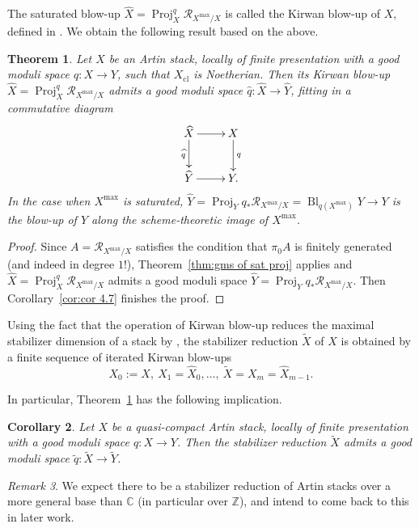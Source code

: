 \documentclass[a4paper,twoside,11pt]{amsart}
\theoremstyle{plain}
\newtheorem{theorem}{Theorem}[section]
\newtheorem{corollary}[theorem]{Corollary}
\theoremstyle{definition}
\theoremstyle{remark}
\newtheorem{remark}[theorem]{Remark}
\numberwithin{equation}{section}
\newcommand{\ZZ}{\mathbb{Z}} %
\newcommand{\CC}{\mathbb{C}} %
\DeclareMathOperator{\Proj}{Proj} %
\DeclareMathOperator{\Bl}{Bl}
\newcommand{\cl}{\mathrm{cl}} %
\newcommand{\rR}{\mathcal{R}}
\renewcommand{\tilde}{\widetilde}
\renewcommand{\hat}{\widehat}
\begin{document}
The saturated blow-up $\hat{X} = \Proj_X^q \rR_{X^{\max}/X}$ is called the Kirwan blow-up of $X$, defined in \cite[Definition~6.5]{HRS}. We obtain the following result based on the above.

\begin{theorem} \label{thm:gms of kirwan blow-up}
    Let $X$ be an Artin stack, locally of finite presentation with a good moduli space $q \colon X \to Y$, such that $X_\cl$ is Noetherian. Then its Kirwan blow-up $\hat{X} = \Proj_X^q \rR_{X^{\max}/X} $ admits a good moduli space $\hat{q} \colon \hat{X} \to \hat{Y}$, fitting in a commutative diagram
    \begin{align*}
        \xymatrix{
        \hat{X} \ar[d]_-{\hat{q}} \ar[r] & X \ar[d]^-{q} \\
        \hat{Y} \ar[r] & Y.
        }
    \end{align*}
    In the case when $X^{\max}$ is saturated, $\hat{Y} = \Proj_Y q_\ast \rR_{X^{\max}/X} =  \Bl_{q(X^{\max})} Y \to Y$ is the blow-up of $Y$ along the scheme-theoretic image of $X^{\max}$.
\end{theorem}

\begin{proof}
    Since $A = \rR_{X^{\max}/X}$ satisfies the condition that $\pi_0 A$ is finitely generated (and indeed in degree $1$!), Theorem~\ref{thm:gms of sat proj} applies and $\hat{X} = \Proj_X^q \rR_{X^{\max}/X}$ admits a good moduli space $\hat{Y} = \Proj_Y q_\ast \rR_{X^{\max}/X}$. Then Corollary~\ref{cor:cor 4.7} finishes the proof.
\end{proof}

Using the fact that the operation of Kirwan blow-up reduces the maximal stabilizer dimension of a stack by \cite[Theorem~6.7]{HRS}, the stabilizer reduction $\tilde{X}$ of $X$ is obtained by a finite sequence of iterated Kirwan blow-ups
$$ X_0 := X,\ X_1 = \hat{X}_0, \ldots,\ \tilde{X} = X_m = \hat{X}_{m-1}.$$

In particular, Theorem~\ref{thm:gms of kirwan blow-up} has the following implication.

\begin{corollary} \label{corr:gms of stab red}
    Let $X$ be a quasi-compact Artin stack, locally of finite presentation with a good moduli space $q \colon X \to Y$. Then the stabilizer reduction $\tilde{X}$ admits a good moduli space $\tilde{q} \colon \tilde{X} \to \tilde{Y}$.
\end{corollary}

\begin{remark}
    We expect there to be a stabilizer reduction of Artin stacks over a more general base than $\CC$ (in particular over $\ZZ$), and intend to come back to this in later work.
\end{remark}
\end{document}
